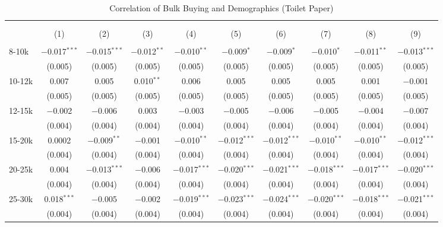 
\begin{table}[!htbp] \centering 
  \caption{Correlation of Bulk Buying and Demographics (Toilet Paper)} 
  \label{tab:discountingBehavior4100} 
\begin{tabular}{@{\extracolsep{5pt}}lccccccccc} 
\\[-1.8ex]\hline 
\hline \\[-1.8ex] 
\\[-1.8ex] & (1) & (2) & (3) & (4) & (5) & (6) & (7) & (8) & (9)\\ 
\hline \\[-1.8ex] 
 8-10k & $-$0.017$^{***}$ & $-$0.015$^{***}$ & $-$0.012$^{**}$ & $-$0.010$^{**}$ & $-$0.009$^{*}$ & $-$0.009$^{*}$ & $-$0.010$^{*}$ & $-$0.011$^{**}$ & $-$0.013$^{***}$ \\ 
  & (0.005) & (0.005) & (0.005) & (0.005) & (0.005) & (0.005) & (0.005) & (0.005) & (0.005) \\ 
  10-12k & 0.007 & 0.005 & 0.010$^{**}$ & 0.006 & 0.005 & 0.005 & 0.005 & 0.001 & $-$0.001 \\ 
  & (0.005) & (0.005) & (0.005) & (0.005) & (0.005) & (0.005) & (0.005) & (0.005) & (0.005) \\ 
  12-15k & $-$0.002 & $-$0.006 & 0.003 & $-$0.003 & $-$0.005 & $-$0.006 & $-$0.005 & $-$0.004 & $-$0.007 \\ 
  & (0.004) & (0.004) & (0.004) & (0.004) & (0.004) & (0.004) & (0.004) & (0.004) & (0.004) \\ 
  15-20k & 0.0002 & $-$0.009$^{**}$ & $-$0.001 & $-$0.010$^{**}$ & $-$0.012$^{***}$ & $-$0.012$^{***}$ & $-$0.010$^{**}$ & $-$0.010$^{**}$ & $-$0.012$^{***}$ \\ 
  & (0.004) & (0.004) & (0.004) & (0.004) & (0.004) & (0.004) & (0.004) & (0.004) & (0.004) \\ 
  20-25k & 0.004 & $-$0.013$^{***}$ & $-$0.006 & $-$0.017$^{***}$ & $-$0.020$^{***}$ & $-$0.021$^{***}$ & $-$0.018$^{***}$ & $-$0.017$^{***}$ & $-$0.020$^{***}$ \\ 
  & (0.004) & (0.004) & (0.004) & (0.004) & (0.004) & (0.004) & (0.004) & (0.004) & (0.004) \\ 
  25-30k & 0.018$^{***}$ & $-$0.005 & $-$0.002 & $-$0.019$^{***}$ & $-$0.023$^{***}$ & $-$0.024$^{***}$ & $-$0.020$^{***}$ & $-$0.018$^{***}$ & $-$0.021$^{***}$ \\ 
  & (0.004) & (0.004) & (0.004) & (0.004) & (0.004) & (0.004) & (0.004) & (0.004) & (0.004) \\ 

\end{tabular}
\end{table}
